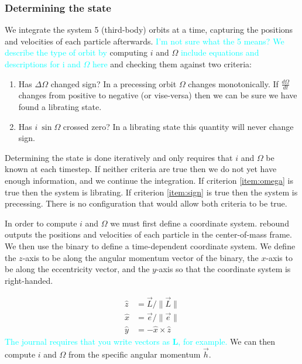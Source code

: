 \documentclass[twocolumn]{aastex631}
\newcommand{\RGM}[1]{\textcolor{cyan}{#1}}
\begin{document}
\subsubsection{Determining the state}
\label{subsubsec:state}
We integrate the system 5 (third-body) orbits at a time, capturing the positions and velocities of each particle afterwards. \RGM{I'm not sure what the 5 means?}
\RGM{We describe the type of orbit by}
computing $i$ and $\Omega$ \RGM{include equations and descriptions for i and $\Omega$ here} and checking them against
two criteria:
\begin{enumerate}
    \item Has $\Delta\Omega$ changed sign? In a precessing orbit $\Omega$ changes monotonically. If 
    $\frac{d\Omega}{dt}$ changes from positive to negative (or vise-versa) then we can be sure we have found a librating state.
    \label{item:omega}
    \item Has $i~\sin{\Omega}$ crossed zero? In a librating state this quantity will never change sign. 
    \label{item:sign}
\end{enumerate}
 Determining the state is done iteratively and only requires that $i$ and $\Omega$
be known at each timestep. If neither criteria are true then we do not yet have enough information, and we continue the integration.
If criterion \ref{item:omega} is true then the system is librating. If criterion \ref{item:sign} is true then the system is precessing.
There is no configuration that would allow both criteria to be true.

In order to compute $i$ and $\Omega$ we must first define a coordinate system. {\sc rebound} outputs the positions and
velocities of each particle in the center-of-mass frame. We then use the binary to define a time-dependent coordinate system.
We define the $z$-axis to be along the angular momentum vector of the binary, the $x$-axis to be along the eccentricity vector, and the
$y$-axis so that the coordinate system is right-handed.

\begin{equation}
\begin{aligned}
    \hat{z} & = \vec{L}/\|\vec{L}\| \\
    \hat{x} & = \vec{e}/\|\vec{e}\| \\
    \hat{y} & = - \hat{x} \times \hat{z}
    \label{eq:coords}
\end{aligned}
\end{equation}
\RGM{The journal requires that you write vectors as $\bm{L}$, for example.}
We can then compute $i$ and $\Omega$ from the specific angular momentum $\vec{h}$.
\end{document}
